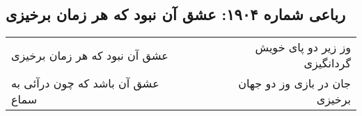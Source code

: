 \begin{center}
\section*{رباعی شماره ۱۹۰۴: عشق آن نبود که هر زمان برخیزی}
\label{sec:1904}
\begin{longtable}{l p{0.5cm} r}
عشق آن نبود که هر زمان برخیزی
&&
وز زیر دو پای خویش گردانگیزی
\\
عشق آن باشد که چون درآئی به سماع
&&
جان در بازی وز دو جهان برخیزی
\\
\end{longtable}
\end{center}
